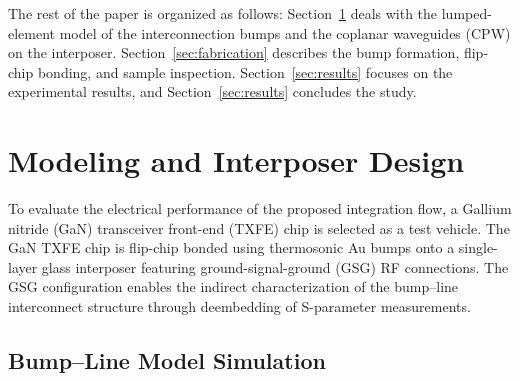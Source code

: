 \documentclass[conference]{IEEEtran}
\begin{document}
The rest of the paper is organized as follows: Section~\ref{sec:model} deals with the lumped-element model of the interconnection bumps and the coplanar waveguides (CPW) on the interposer. Section~\ref{sec:fabrication} describes the bump formation, flip-chip bonding, and sample inspection. Section~\ref{sec:results} focuses on the experimental results, and Section~\ref{sec:results} concludes the study.

\section{Modeling and Interposer Design}\label{sec:model}
To evaluate the electrical performance of the proposed integration flow, a Gallium nitride (GaN) transceiver front-end (TXFE) chip is selected as a test vehicle. The GaN TXFE chip is flip-chip bonded using thermosonic Au bumps onto a single-layer glass interposer featuring ground-signal-ground (GSG) RF connections. The GSG configuration enables the indirect characterization of the bump–line interconnect structure through deembedding of S-parameter measurements.

\subsection{Bump--Line Model Simulation}\label{subsec:bump_line_model}
\end{document}
